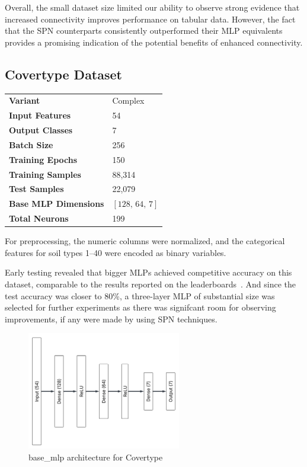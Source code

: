 Overall, the small dataset size limited our ability to observe strong evidence that increased connectivity improves performance on tabular data. However, the fact that the SPN counterparts consistently outperformed their MLP equivalents provides a promising indication of the potential benefits of enhanced connectivity.

\subsection{Covertype Dataset}

\begin{tabular}{@{}ll@{}}
\textbf{Variant} & Complex \\
\textbf{Input Features} & 54 \\
\textbf{Output Classes} & 7 \\
\textbf{Batch Size} & 256 \\
\textbf{Training Epochs} & 150 \\
\textbf{Training Samples} & 88,314 \\
\textbf{Test Samples} & 22,079 \\
\textbf{Base MLP Dimensions} & $[128,\, 64,\, 7]$ \\
\textbf{Total Neurons} & 199 \\
\end{tabular}

For preprocessing, the numeric columns were normalized, and the categorical features for soil types 1–40 were encoded as binary variables.

Early testing revealed that bigger MLPs achieved competitive accuracy on this dataset, comparable to the results reported on the leaderboards~\cite{kaggle_covertype_leaderboard}. And since the test accuracy was closer to 80\%, a three-layer MLP of substantial size was selected for further experiments as there was signifcant room for observing improvements, if any were made by using SPN techniques.

\begin{figure}[H]
    \centering
    \includegraphics[height=0.28\textheight,width=0.6\textwidth]{Figures/Results/Covertype/Covertype_base_mlp_architecture.png} 
    \captionsetup{justification=centering}  %
    \caption{base\_mlp architecture for Covertype}
    \label{fig:covertypeMlpBaseArch}
\end{figure}

